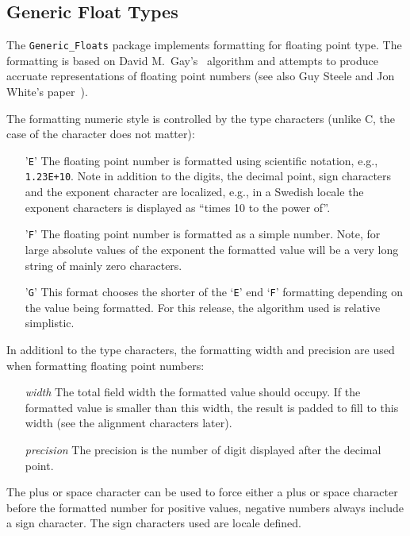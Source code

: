 \subsection{Generic Float Types}
\label{sec:generic_float}

The \verb|Generic_Floats| package implements formatting for
floating point type.  The formatting is based on David M.\ Gay's~\cite{Gay90}
algorithm and attempts to produce accruate representations of floating
point numbers (see also Guy Steele and Jon White's paper~\cite{Steele04}).

The formatting numeric style is controlled by the type characters (unlike
C, the case of the character does not matter):
\begin{itemize}
\item['\texttt{E}']
    The floating point number is formatted using scientific notation, e.g.,
    \verb|1.23E+10|.  Note in addition to the digits, the decimal point, sign
    characters and the exponent character are localized, e.g., in a Swedish
    locale the exponent characters is displayed as ``times 10 to the power of''.
\item['\texttt{F}']
    The floating point number is formatted as a simple number.  Note, for large
    absolute values of the exponent the formatted value will be a very long
    string of mainly zero characters.
\item['\texttt{G}']
    This format chooses the shorter of the `\texttt{E}' end `\texttt{F}'
    formatting depending on the value being formatted.  For this release, the
    algorithm used is relative simplistic.
\end{itemize}

In additionl to the type characters, the formatting width and precision are
used when formatting floating point numbers:
\begin{itemize}
\item[\textit{width}]
    The total field width the formatted value should occupy.  If the formatted
    value is smaller than this width, the result is padded to fill to this
    width (see the alignment characters later).
\item[\textit{precision}]
    The precision is the number of digit displayed after the decimal point.
\end{itemize}

The plus or space character can be used to force either a plus or space
character before the formatted number for positive values, negative numbers
always include a sign character.  The sign characters used are locale
defined.

